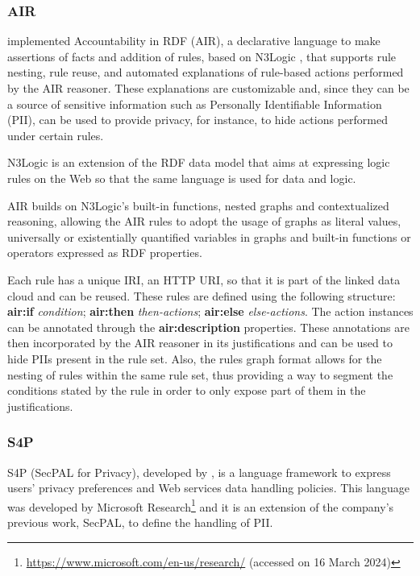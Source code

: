 \subsubsection{AIR}
\label{sec:air}

\cite{hitzler_analyzing_2010} implemented Accountability in RDF (AIR), a declarative language to make assertions of facts and addition of rules, based on N3Logic \citep{berners-lee_n3logic_2008}, that supports rule nesting, rule reuse, and automated explanations of rule-based actions performed by the AIR reasoner.
These explanations are customizable and, since they can be a source of sensitive information such as Personally Identifiable Information (PII), can be used to provide privacy, for instance, to hide actions performed under certain rules.

N3Logic is an extension of the RDF data model that aims at expressing logic rules on the Web so that the same language is used for data and logic.

AIR builds on N3Logic's built-in functions, nested graphs and contextualized reasoning, allowing the AIR rules to adopt the usage of graphs as literal values, universally or existentially quantified variables in graphs and built-in functions or operators expressed as RDF properties.

Each rule has a unique IRI, an HTTP URI, so that it is part of the linked data cloud and can be reused.
These rules are defined using the following structure: \textbf{air:if} \textit{condition}; \textbf{air:then} \textit{then-actions}; \textbf{air:else} \textit{else-actions}.
The action instances can be annotated through the \textbf{air:description} properties.
These annotations are then incorporated by the AIR reasoner in its justifications and can be used to hide PIIs present in the rule set.
Also, the rules graph format allows for the nesting of rules within the same rule set, thus providing a way to segment the conditions stated by the rule in order to only expose part of them in the justifications.

\subsubsection{S4P}
\label{sec:s4p}

S4P (SecPAL for Privacy), developed by \cite{becker_framework_2009, becker_s4p_2010}, is a language framework to express users' privacy preferences and Web services data handling policies.
This language was developed by Microsoft Research\footnote{\url{https://www.microsoft.com/en-us/research/} (accessed on 16 March 2024)} and it is an extension of the company's previous work, SecPAL, to define the handling of PII.

